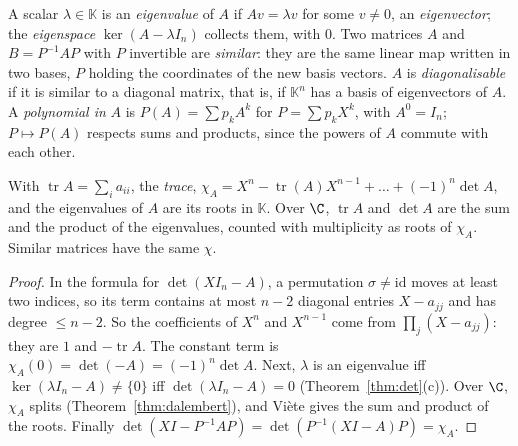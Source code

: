 \begin{reminder}
A scalar $\lambda\in\mathbb K$ is an \emph{eigenvalue} of $A$ if $Av=\lambda v$ for some $v\ne0$, an \emph{eigenvector}; the \emph{eigenspace} $\ker(A-\lambda I_n)$ collects them, with $0$. Two matrices $A$ and $B=P^{-1}AP$ with $P$ invertible are \emph{similar}: they are the same linear map written in two bases, $P$ holding the coordinates of the new basis vectors. $A$ is \emph{diagonalisable} if it is similar to a diagonal matrix, that is, if $\mathbb K^n$ has a basis of eigenvectors of $A$. A \emph{polynomial in} $A$ is $P(A)=\sum p_kA^k$ for $P=\sum p_kX^k$, with $A^0=I_n$; $P\mapsto P(A)$ respects sums and products, since the powers of $A$ commute with each other.
\end{reminder}

\begin{proposition}\label{prop:charpoly}
With $\operatorname{tr}A=\sum_i a_{ii}$, the \emph{trace}, $\chi_A=X^n-\operatorname{tr}(A)X^{n-1}+\dots+(-1)^n\det A$, and the eigenvalues of $A$ are its roots in $\mathbb K$. Over $\C$, $\operatorname{tr}A$ and $\det A$ are the sum and the product of the eigenvalues, counted with multiplicity as roots of $\chi_A$. Similar matrices have the same $\chi$.
\end{proposition}
\begin{proof}
In the formula for $\det(XI_n-A)$, a permutation $\sigma\ne\mathrm{id}$ moves at least two indices, so its term contains at most $n-2$ diagonal entries $X-a_{jj}$ and has degree $\le n-2$. So the coefficients of $X^n$ and $X^{n-1}$ come from $\prod_j(X-a_{jj})$: they are $1$ and $-\operatorname{tr}A$. The constant term is $\chi_A(0)=\det(-A)=(-1)^n\det A$. Next, $\lambda$ is an eigenvalue iff $\ker(\lambda I_n-A)\ne\{0\}$ iff $\det(\lambda I_n-A)=0$ (Theorem~\ref{thm:det}(c)). Over $\C$, $\chi_A$ splits (Theorem~\ref{thm:dalembert}), and Vi\`ete gives the sum and product of the roots. Finally $\det(XI-P^{-1}AP)=\det\left(P^{-1}(XI-A)P\right)=\chi_A$.
\end{proof}

